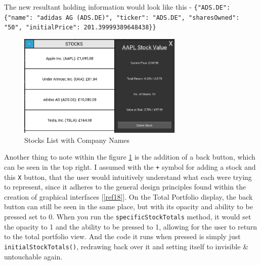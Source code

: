 \documentclass{article}
\begin{document}
The new resultant holding information would look like this - \texttt{\{"ADS.DE": \{"name": "adidas AG (ADS.DE)", "ticker": "ADS.DE", "sharesOwned": "50", "initialPrice": 201.39999389648438\}\}}\\\vspace{0.3cm}

\begin{figure}[h]
  \centering
  \includegraphics[width=0.7\textwidth]{Images/Term 2 Images/image (12).png}
  \caption{Stocks List with Company Names}
  \label{fig:Stock and Ticker Names}
\end{figure}

\vspace{0.3cm}
Another thing to note within the figure \ref{fig:Stock and Ticker Names} is the addition of a back button, which can be seen in the top right. I assumed with the \texttt{+} symbol for adding a stock and this \texttt{X} button, that the user would intuitively understand what each were trying to represent, since it adheres to the general design principles found within the creation of graphical interfaces [\ref{ref18}]. On the Total Portfolio display, the back button can still be seen in the same place, but with its opacity and ability to be pressed set to 0. When you run the \texttt{specificStockTotals} method, it would set the opacity to 1 and the ability to be pressed to 1, allowing for the user to return to the total portfolio view. And the code it runs when pressed is simply just \texttt{initialStockTotals()}, redrawing back over it and setting itself to invisible \& untouchable again.\\\vspace{0.3cm}
\end{document}
